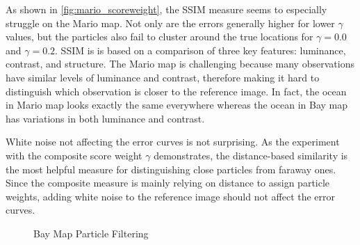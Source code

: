 \documentclass{article}
\begin{document}
As shown in \ref{fig:mario_scoreweight}, the SSIM measure seems to especially struggle on the Mario map. Not only are the errors generally higher for lower $\gamma$ values, but the particles also fail to cluster around the true locations for $\gamma=0.0$ and $\gamma=0.2$. SSIM is is based on a comparison of three key features: luminance, contrast, and structure. The Mario map is challenging because many observations have similar levels of luminance and contrast, therefore making it hard to distinguish which observation is closer to the reference image. In fact, the ocean in Mario map looks exactly the same everywhere whereas the ocean in Bay map has variations in both luminance and contrast.

White noise not affecting the error curves is not surprising. As the experiment with the composite score weight $\gamma$ demonstrates, the distance-based similarity is the most helpful measure for distinguishing close particles from faraway ones. Since the composite measure is mainly relying on distance to assign particle weights, adding white noise to the reference image should not affect the error curves.  


\begin{figure}[!ht]
    \centering
    \vspace{-0.2cm}
    \hspace{0.2cm}%
    \hspace{0.2cm}%
    \hspace{0.2cm}%
    \hspace{0.2cm}%
    \hspace{0.2cm}%
    \hspace{0.2cm}%
    \vspace{-0.4cm}
    \caption{Bay Map Particle Filtering}
    \label{fig:bay_particles}
    \vspace{-0.3cm}
\end{figure}
\end{document}
